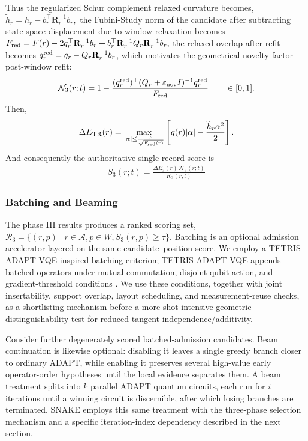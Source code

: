 \documentclass[
  reprint,
  amsmath,
  amssymb,
  aps,
  pra,
  nofootinbib,
  superscriptaddress,
  floatfix
]{revtex4-2}
\newcommand{\placeholder}[1]{\textcolor{red!70!black}{\ifmmode\left[#1\right]\else\textsf{[#1]}\fi}}
\newcommand{\TR}{\mathrm{TR}}
\newcommand{\eps}{\varepsilon}
\begin{document}
Thus the regularized Schur complement relaxed curvature becomes, $\widetilde h_r=h_r-b_r^{\top}\mathbf R_r^{-1}b_r,$ the Fubini-Study norm of the candidate after subtracting state-space displacement due to window relaxation becomes $F_{\rm red}=F(r)-2q_r^{\top}\mathbf R_r^{-1}b_r+b_r^{\top}\mathbf R_r^{-1}Q_r\mathbf R_r^{-1}b_r,$ the relaxed overlap after refit becomes $q_r^{\rm red}=q_r-Q_r\mathbf R_r^{-1}b_r$, which motivates the geometrical novelty factor post-window refit:
\begin{equation}
\mathcal N_3(r;t)=1-\frac{(q_r^{\rm red})^{\top}(Q_r+\eps_{\rm nov}I)^{-1}q_r^{\rm red}}
{F_{\rm red}}
\qquad \in [0,1] .
\end{equation}
Then,
\begin{equation}
\Delta E_{\TR}(r)=
\max_{|\alpha|\le \frac{\rho}{\sqrt{F_{\rm red}(r)}}}
\left[g(r)|\alpha|-\frac{\widetilde h_r \alpha^2}{2}\right].
\label{eq:phase3_gain}
\end{equation}
And consequently the authoritative single-record score is
\begin{equation}
\begin{split}
S_3(r;t)=\frac{\Delta E_{3}(r)\,\mathcal N_3(r;t)}{K_3(r;t)}
\end{split}
\label{eq:phase3_score}
\end{equation}

\subsubsection{Batching and Beaming}
The phase III results produces a ranked scoring set, $\mathcal R_3=\{(r,p) \mid r \in \mathcal A, p\in W, S_3(r,p) \geq \tau\}$. Batching is an optional admission accelerator layered on the same candidate--position score. We employ a TETRIS-ADAPT-VQE-inspired batching criterion; TETRIS-ADAPT-VQE appends batched operators under mutual-commutation, disjoint-qubit action, and gradient-threshold conditions \cite{Anastasiou2024}. We use these conditions, together with joint insertability, support overlap, layout scheduling, and measurement-reuse checks, as a shortlisting mechanism before a more shot-intensive geometric distinguishability test for reduced tangent independence/additivity.

Consider further degenerately scored batched-admission candidates. Beam continuation is likewise optional: disabling it leaves a single greedy branch closer to ordinary ADAPT, while enabling it preserves several high-value early operator-order hypotheses until the local evidence separates them. A beam treatment splits into $k$ parallel ADAPT quantum circuits, each run for $i$ iterations until a winning circuit is discernible, after which losing branches are terminated. SNAKE employs this same treatment with the three-phase selection mechanism and a specific iteration-index dependency described in the next section.
\end{document}
